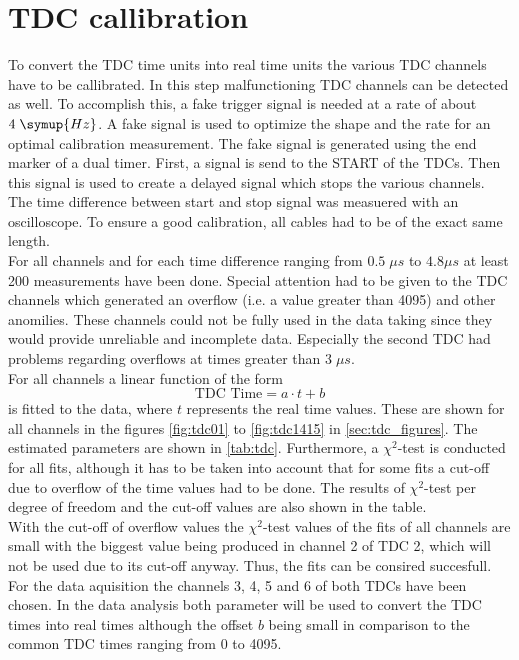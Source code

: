 \section{TDC callibration}
To convert the TDC time units into real time units the various TDC channels have to be callibrated.
In this step malfunctioning TDC channels can be detected as well. To accomplish this,
a fake trigger signal is needed at a rate of about $4 \; \symup{Hz}$. A fake signal is used to optimize 
the shape and the rate for an optimal calibration measurement. The fake signal is generated using the 
end marker of a dual timer. First, a signal is send to the START of the TDCs. Then this signal is used 
to create a delayed signal which stops the various channels. The time difference between start and stop signal was measuered with 
an oscilloscope. To ensure a good calibration, all cables 
had to be of the exact same length.\\
For all channels and for each time difference ranging from $0.5 \; \mu s$ to $4.8 \mu s$ 
at least 200 measurements have been done.
Special attention had to be given to the TDC channels which generated an overflow (i.e. a value greater than 4095)
and other anomilies.
These channels could not be fully used in the data taking since they would provide unreliable
and incomplete data. Especially the second TDC had problems regarding overflows at times greater than $3 \; \mu s$.\\
For all channels a linear function of the form 
\begin{equation*}
    \text{TDC Time} = a \cdot t + b
\end{equation*}
is fitted to the data, where $t$ represents the real time values.
These are shown for all channels in the figures \ref{fig:tdc01} to
\ref{fig:tdc1415} in \autoref{sec:tdc_figures}.
The estimated parameters are shown in \autoref{tab:tdc}. Furthermore, a $\chi^2$-test is conducted 
for all fits, although it has to be taken into account that for some fits a cut-off due to overflow of
the time values had to be done. The results of $\chi^2$-test per degree of freedom and the cut-off values 
are also shown in the table.\\

With the cut-off of overflow values the $\chi^2$-test values of the fits of all channels are 
small with the biggest value being produced in channel 2 of TDC 2, which will not be used due to 
its cut-off anyway. Thus, the fits can be consired succesfull. 
For the data aquisition the channels 3, 4, 5 and 6 of both TDCs have been chosen.
In the data analysis both parameter will be used to convert the TDC times into real times although the 
offset $b$ being small in comparison to the common TDC times ranging from 0 to 4095.



